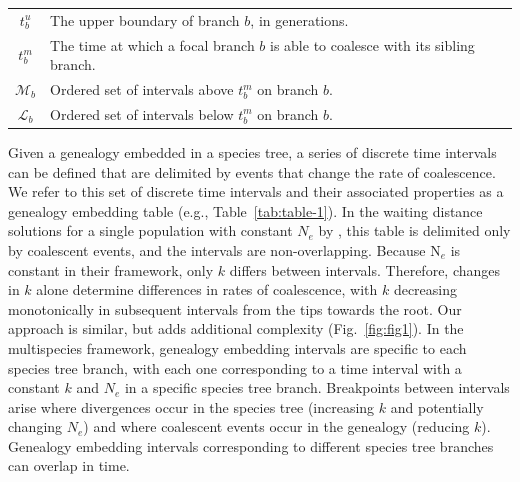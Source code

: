 \documentclass[11pt]{article}
\begin{document}
\begin{table}[!b]
\begin{tabular}[t]{ |c|l| }
	$t_b^u$        & The upper boundary of branch $b$, in generations. \\
	$t_b^m$        & The time at which a focal branch $b$ is able to coalesce with its sibling branch. \\
	$\mathcal{M}_b$  & Ordered set of intervals above $t_b^m$ on branch $b$.\\
	$\mathcal{L}_b$  & Ordered set of intervals below $t_b^m$ on branch $b$.\\	
	\bottomrule
\end{tabular}
\end{table}






Given a genealogy embedded in a species tree, a series of discrete
time intervals can be defined that are delimited 
by events that change the rate of coalescence. 
We refer to this 
set of discrete time intervals and their associated properties
as a genealogy embedding table (e.g., Table~\ref{tab:table-1}). 
In the waiting distance solutions for a single population with constant $N_e$ 
by \citet{deng_distribution_2021}, this table is delimited only by coalescent 
events, and the intervals are non-overlapping. 
Because N$_e$ is constant in their framework, only $k$ differs between 
intervals. Therefore, changes in $k$ alone determine differences in rates of coalescence, 
with $k$ decreasing monotonically in subsequent intervals from the tips towards the root. 
Our approach is similar, but adds additional complexity (Fig.~\ref{fig:fig1}). 
In the multispecies framework, genealogy embedding intervals are specific to each 
species tree branch, with each one corresponding to a time interval with a constant 
$k$ and $N_e$ in a specific species tree branch. 
Breakpoints between intervals arise where divergences 
occur in the species tree (increasing $k$ and potentially changing $N_e$) 
and where coalescent events occur in the genealogy (reducing $k$). 
Genealogy embedding intervals corresponding to different species tree 
branches can overlap in time.
\end{document}
